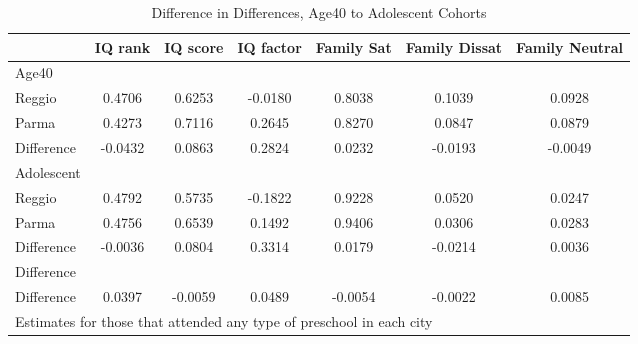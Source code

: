 \begin{table}[htbp]\centering
\caption{Difference in Differences, Age40 to Adolescent Cohorts}
\begin{tabular}{l*{6}{c}}
\hline\hline
            &     IQ rank&    IQ score&   IQ factor&  Family Sat&Family Dissat&Family Neutral\\
\hline
Age40       &            &            &            &            &            &            \\
Reggio      &      0.4706&      0.6253&     -0.0180&      0.8038&      0.1039&      0.0928\\
Parma       &      0.4273&      0.7116&      0.2645&      0.8270&      0.0847&      0.0879\\
Difference  &     -0.0432&      0.0863&      0.2824&      0.0232&     -0.0193&     -0.0049\\
\hline
Adolescent  &            &            &            &            &            &            \\
Reggio      &      0.4792&      0.5735&     -0.1822&      0.9228&      0.0520&      0.0247\\
Parma       &      0.4756&      0.6539&      0.1492&      0.9406&      0.0306&      0.0283\\
Difference  &     -0.0036&      0.0804&      0.3314&      0.0179&     -0.0214&      0.0036\\
\hline
Difference  &            &            &            &            &            &            \\
Difference  &      0.0397&     -0.0059&      0.0489&     -0.0054&     -0.0022&      0.0085\\
\hline\hline
\multicolumn{7}{l}{\footnotesize Estimates for those that attended any type of preschool in each city}\\
\end{tabular}
\end{table}
